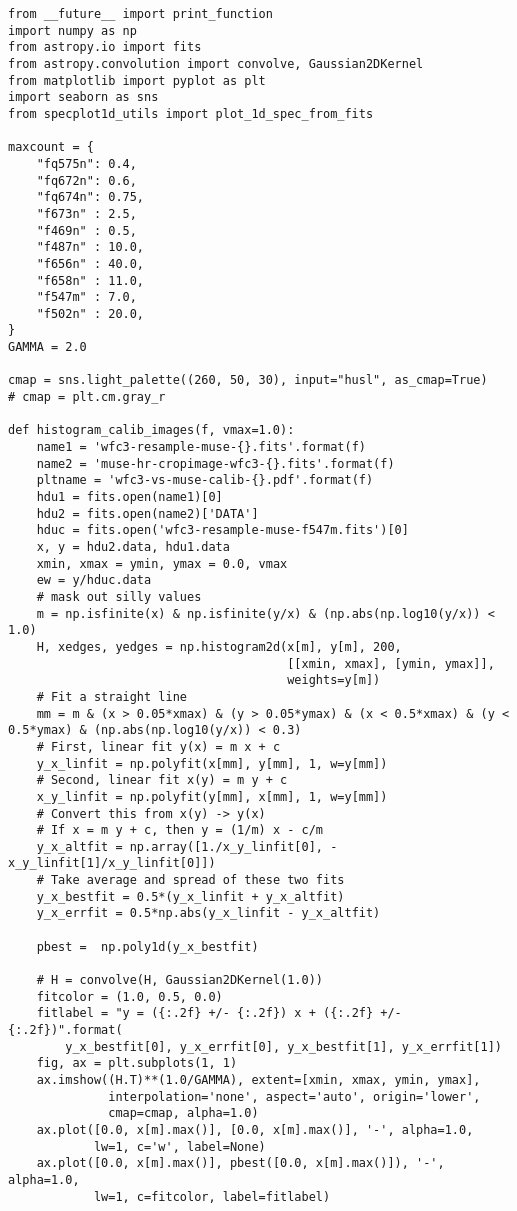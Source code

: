 \documentclass[11pt]{article}
\begin{document}
\begin{verbatim}
from __future__ import print_function
import numpy as np
from astropy.io import fits
from astropy.convolution import convolve, Gaussian2DKernel
from matplotlib import pyplot as plt
import seaborn as sns
from specplot1d_utils import plot_1d_spec_from_fits

maxcount = {
    "fq575n": 0.4,
    "fq672n": 0.6,
    "fq674n": 0.75,
    "f673n" : 2.5,
    "f469n" : 0.5,
    "f487n" : 10.0,
    "f656n" : 40.0, 
    "f658n" : 11.0, 
    "f547m" : 7.0, 
    "f502n" : 20.0,
}
GAMMA = 2.0

cmap = sns.light_palette((260, 50, 30), input="husl", as_cmap=True)
# cmap = plt.cm.gray_r

def histogram_calib_images(f, vmax=1.0):
    name1 = 'wfc3-resample-muse-{}.fits'.format(f)
    name2 = 'muse-hr-cropimage-wfc3-{}.fits'.format(f)
    pltname = 'wfc3-vs-muse-calib-{}.pdf'.format(f)
    hdu1 = fits.open(name1)[0]
    hdu2 = fits.open(name2)['DATA']
    hduc = fits.open('wfc3-resample-muse-f547m.fits')[0]
    x, y = hdu2.data, hdu1.data
    xmin, xmax = ymin, ymax = 0.0, vmax
    ew = y/hduc.data
    # mask out silly values
    m = np.isfinite(x) & np.isfinite(y/x) & (np.abs(np.log10(y/x)) < 1.0)
    H, xedges, yedges = np.histogram2d(x[m], y[m], 200,
                                       [[xmin, xmax], [ymin, ymax]],
                                       weights=y[m])
    # Fit a straight line
    mm = m & (x > 0.05*xmax) & (y > 0.05*ymax) & (x < 0.5*xmax) & (y < 0.5*ymax) & (np.abs(np.log10(y/x)) < 0.3)
    # First, linear fit y(x) = m x + c
    y_x_linfit = np.polyfit(x[mm], y[mm], 1, w=y[mm])
    # Second, linear fit x(y) = m y + c
    x_y_linfit = np.polyfit(y[mm], x[mm], 1, w=y[mm])
    # Convert this from x(y) -> y(x)
    # If x = m y + c, then y = (1/m) x - c/m
    y_x_altfit = np.array([1./x_y_linfit[0], -x_y_linfit[1]/x_y_linfit[0]])
    # Take average and spread of these two fits
    y_x_bestfit = 0.5*(y_x_linfit + y_x_altfit)
    y_x_errfit = 0.5*np.abs(y_x_linfit - y_x_altfit)

    pbest =  np.poly1d(y_x_bestfit)

    # H = convolve(H, Gaussian2DKernel(1.0))
    fitcolor = (1.0, 0.5, 0.0)
    fitlabel = "y = ({:.2f} +/- {:.2f}) x + ({:.2f} +/- {:.2f})".format(
        y_x_bestfit[0], y_x_errfit[0], y_x_bestfit[1], y_x_errfit[1])
    fig, ax = plt.subplots(1, 1)
    ax.imshow((H.T)**(1.0/GAMMA), extent=[xmin, xmax, ymin, ymax],
              interpolation='none', aspect='auto', origin='lower', 
              cmap=cmap, alpha=1.0)
    ax.plot([0.0, x[m].max()], [0.0, x[m].max()], '-', alpha=1.0,
            lw=1, c='w', label=None)
    ax.plot([0.0, x[m].max()], pbest([0.0, x[m].max()]), '-', alpha=1.0,
            lw=1, c=fitcolor, label=fitlabel)


\end{verbatim}
\end{document}
